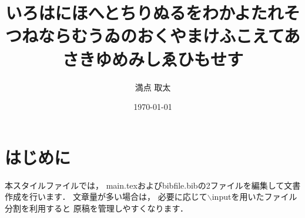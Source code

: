 \documentclass[zemi]{sty/penguin}
\begin{document}
\date{\today}
\title{いろはにほへとちりぬるをわかよたれそつねならむうゐのおくやまけふこえてあさきゆめみしゑひもせす}
\author{満点 取太}
\maketitle

\section{はじめに}
本スタイルファイルでは，
main.texおよびbibfile.bibの2ファイルを編集して文書作成を行います．
文章量が多い場合は，
必要に応じて$\backslash$inputを用いたファイル分割を利用すると
原稿を管理しやすくなります．




\end{document}
